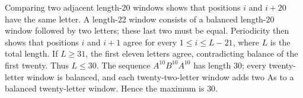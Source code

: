 Comparing two adjacent length-20 windows shows that positions $i$ and $i+20$ have the same letter. A length-22 window consists of a balanced length-20 window followed by two letters; these last two must be equal. Periodicity then shows that positions $i$ and $i+1$ agree for every $1\le i\le L-21$, where $L$ is the total length. If $L\ge 31$, the first eleven letters agree, contradicting balance of the first twenty. Thus $L\le 30$. The sequence $A^{10}B^{10}A^{10}$ has length $30$; every twenty-letter window is balanced, and each twenty-two-letter window adds two As to a balanced twenty-letter window. Hence the maximum is $\boxed{30}$.
